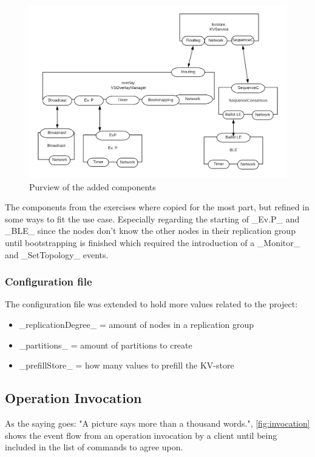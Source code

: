 \documentclass[a4paper]{scrartcl}
\begin{document}
\begin{figure}[h!]
  \begin{center}
    \includegraphics[scale=0.4]{Modified.png}
    \caption{Purview of the added components}
    \label{fig:modified}
  \end{center}
\end{figure}

The components from the exercises where copied for the most part, but refined in some ways to fit the use case.
Especially regarding the starting of _Ev.P_ and _BLE_ since the nodes don't know the other nodes in their replication group until bootstrapping is finished which required the introduction of a _Monitor_ and _SetTopology_ events.

\subsubsection{Configuration file}
The configuration file was extended to hold more values related to the project:
\begin{itemize}
\item _replicationDegree_ = amount of nodes in a replication group
\item _partitions_ = amount of partitions to create
\item _prefillStore_ = how many values to prefill the KV-store
\end{itemize}

\subsection{Operation Invocation}
As the saying goes: "A picture says more than a thousand words.", \ref{fig:invocation} shows the event flow from an operation invocation by a client until being included in the list of commands to agree upon.
\end{document}
